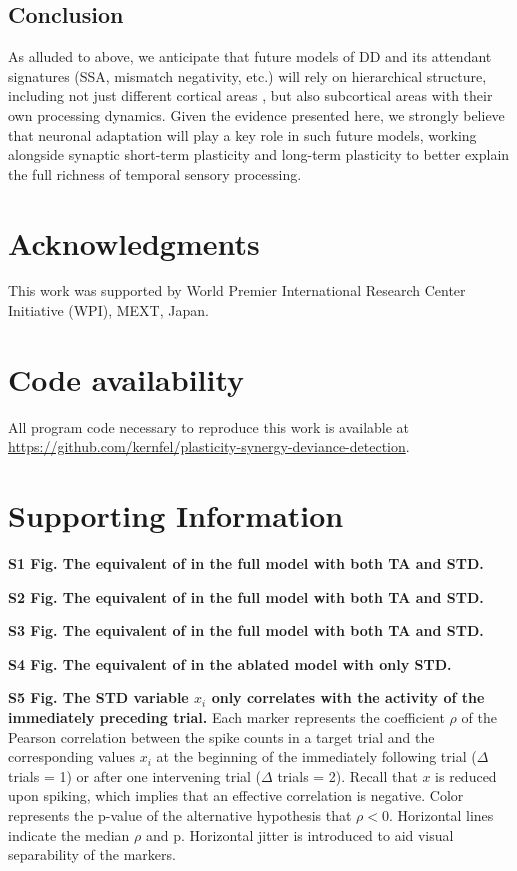 \documentclass[9pt,lineno,onehalfspacing]{elife}
\begin{document}
\subsection{Conclusion}

As alluded to above, we anticipate that future models of DD and its attendant signatures (SSA, mismatch negativity, etc.) will rely on hierarchical structure, including not just different cortical areas \citep{May2015-lt, Park2020-oa}, but also subcortical areas with their own processing dynamics. Given the evidence presented here, we strongly believe that neuronal adaptation will play a key role in such future models, working alongside synaptic short-term plasticity \citep{Yarden2017-eh} and long-term plasticity \citep{Hertag2020-kc} to better explain the full richness of temporal sensory processing.

\section{Acknowledgments}

This work was supported by World Premier International Research Center Initiative (WPI), MEXT, Japan.

\section{Code availability}

All program code necessary to reproduce this work is available at \\
\url{https://github.com/kernfel/plasticity-synergy-deviance-detection}.



\section{Supporting Information}

\textbf{S1 Fig. The equivalent of  in the full model with both TA and STD.}

\textbf{S2 Fig. The equivalent of  in the full model with both TA and STD.}

\textbf{S3 Fig. The equivalent of  in the full model with both TA and STD.}

\textbf{S4 Fig. The equivalent of  in the ablated model with only STD.}

\textbf{S5 Fig. The STD variable $x_i$ only correlates with the activity of the immediately preceding trial.}
Each marker represents the coefficient $\rho$ of the Pearson correlation between the spike counts in a target trial and the corresponding values $x_i$ at the beginning of the immediately following trial ($\Delta$ trials = 1) or after one intervening trial ($\Delta$ trials = 2). Recall that $x$ is reduced upon spiking, which implies that an effective correlation is negative. Color represents the p-value of the alternative hypothesis that $\rho < 0$. Horizontal lines indicate the median $\rho$ and p. Horizontal jitter is introduced to aid visual separability of the markers.
\end{document}
